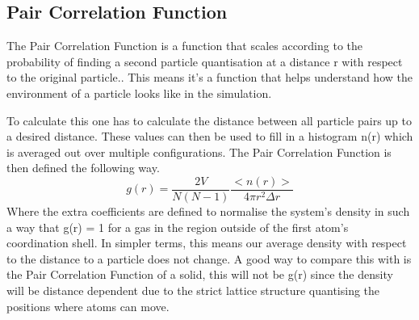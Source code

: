 \documentclass[a4paper,12pt]{article} %
\begin{document}
\subsection{Pair Correlation Function}
The Pair Correlation Function is a function that scales according to the probability of finding a second particle quantisation at a distance r with respect to the original particle.\cite{Biology}.
This means it's a function that helps understand how the environment of a particle looks like in the simulation.\cite{chandler}\par
To calculate this one has to calculate the distance between all particle pairs up to a desired distance. These values can then be used to fill in a histogram n(r) which is averaged out over multiple configurations. The Pair Correlation Function is then defined the following way.
\begin{equation}\label{PairCorr}
    g(r) = \frac{2V}{N(N-1)}\frac{<n(r)>}{4\pi r^2\Delta r}
\end{equation}
Where the extra coefficients are defined to normalise the system's density in such a way that g(r) = 1 for a gas in the region outside of the first atom's coordination shell. In simpler terms, this means our average density with respect to the distance to a particle does not change.\cite{chandler} A good way to compare this with is the Pair Correlation Function of a solid, this will not be g(r) since the density will be distance dependent due to the strict lattice structure quantising the positions where atoms can move.
\end{document}
